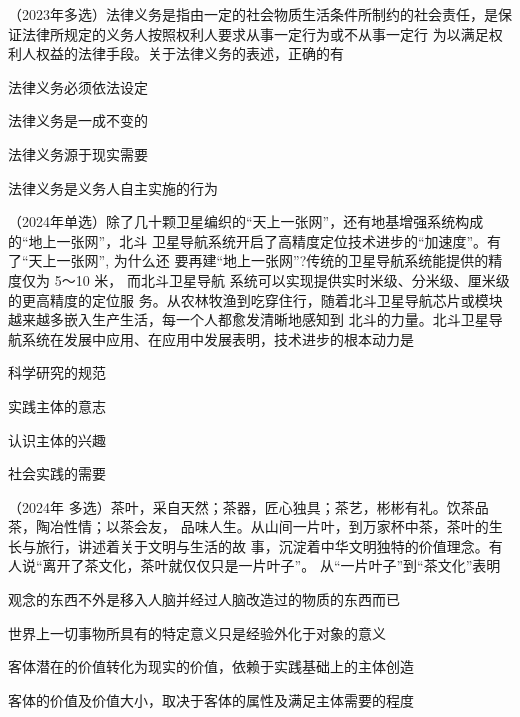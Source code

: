 \documentclass[lang=cn,blue,10pt,scheme=chinese,twocol]{zznote}
\begin{document}
\begin{example} （2023年多选）法律义务是指由一定的社会物质生活条件所制约的社会责任，是保 证法律所规定的义务人按照权利人要求从事一定行为或不从事一定行
	为以满足权利人权益的法律手段。关于法律义务的表述，正确的有

	\begin{choice}
		\item 法律义务必须依法设定
		\item 法律义务是一成不变的
		\item 法律义务源于现实需要
		\item 法律义务是义务人自主实施的行为
	\end{choice}
\end{example}

\begin{example}	（2024年单选）除了几十颗卫星编织的“天上一张网”，还有地基增强系统构成的“地上一张网”，北斗 卫星导航系统开启了高精度定位技术进步的“加速度”。有了“天上一张网”, 为什么还 要再建“地上一张网”?传统的卫星导航系统能提供的精度仅为 5～10 米， 而北斗卫星导航 系统可以实现提供实时米级、分米级、厘米级的更高精度的定位服 务。从农林牧渔到吃穿住行，随着北斗卫星导航芯片或模块越来越多嵌入生产生活，每一个人都愈发清晰地感知到 北斗的力量。北斗卫星导航系统在发展中应用、在应用中发展表明，技术进步的根本动力是
	\begin{choice}
		\item 科学研究的规范
		\item 实践主体的意志
		\item 认识主体的兴趣
		\item 社会实践的需要
	\end{choice}
\end{example}

\begin{example} （2024年 多选）茶叶，采自天然；茶器，匠心独具；茶艺，彬彬有礼。饮茶品茶，陶冶性情；以茶会友， 品味人生。从山间一片叶，到万家杯中茶，茶叶的生长与旅行，讲述着关于文明与生活的故 事，沉淀着中华文明独特的价值理念。有人说“离开了茶文化，茶叶就仅仅只是一片叶子”。 从“一片叶子”到“茶文化”表明
	\begin{choice}
		\item 观念的东西不外是移入人脑并经过人脑改造过的物质的东西而已
		\item 世界上一切事物所具有的特定意义只是经验外化于对象的意义
		\item 客体潜在的价值转化为现实的价值，依赖于实践基础上的主体创造
		\item 客体的价值及价值大小，取决于客体的属性及满足主体需要的程度
	\end{choice}
\end{example}
\end{document}
